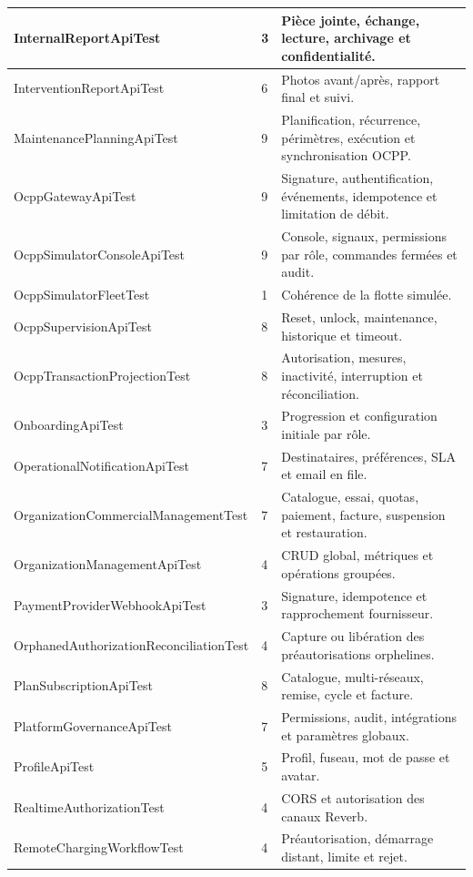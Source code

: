 \begin{longtable}{|L{5.6cm}|C{1.4cm}|L{8.0cm}|}
InternalReportApiTest & 3 & Pièce jointe, échange, lecture, archivage et confidentialité. \\ \hline
InterventionReportApiTest & 6 & Photos avant/après, rapport final et suivi. \\ \hline
MaintenancePlanningApiTest & 9 & Planification, récurrence, périmètres, exécution et synchronisation OCPP. \\ \hline
OcppGatewayApiTest & 9 & Signature, authentification, événements, idempotence et limitation de débit. \\ \hline
OcppSimulatorConsoleApiTest & 9 & Console, signaux, permissions par rôle, commandes fermées et audit. \\ \hline
OcppSimulatorFleetTest & 1 & Cohérence de la flotte simulée. \\ \hline
OcppSupervisionApiTest & 8 & Reset, unlock, maintenance, historique et timeout. \\ \hline
OcppTransactionProjectionTest & 8 & Autorisation, mesures, inactivité, interruption et réconciliation. \\ \hline
OnboardingApiTest & 3 & Progression et configuration initiale par rôle. \\ \hline
OperationalNotificationApiTest & 7 & Destinataires, préférences, SLA et email en file. \\ \hline
OrganizationCommercial\allowbreak ManagementTest & 7 & Catalogue, essai, quotas, paiement, facture, suspension et restauration. \\ \hline
OrganizationManagementApiTest & 4 & CRUD global, métriques et opérations groupées. \\ \hline
PaymentProviderWebhookApiTest & 3 & Signature, idempotence et rapprochement fournisseur. \\ \hline
OrphanedAuthorization\allowbreak ReconciliationTest & 4 & Capture ou libération des préautorisations orphelines. \\ \hline
PlanSubscriptionApiTest & 8 & Catalogue, multi-réseaux, remise, cycle et facture. \\ \hline
PlatformGovernanceApiTest & 7 & Permissions, audit, intégrations et paramètres globaux. \\ \hline
ProfileApiTest & 5 & Profil, fuseau, mot de passe et avatar. \\ \hline
RealtimeAuthorizationTest & 4 & CORS et autorisation des canaux Reverb. \\ \hline
RemoteChargingWorkflowTest & 4 & Préautorisation, démarrage distant, limite et rejet. \\ \hline

\end{longtable}
